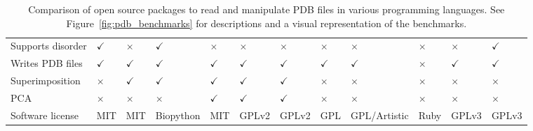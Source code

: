 \begin{table}
\begin{footnotesize}
\begin{tabular}{ l p{1.2cm} p{1.2cm} p{1.5cm} p{1.2cm} p{1.7cm} p{1.2cm} p{1.2cm} p{1.2cm} p{1.2cm} p{1.2cm} p{1.2cm} }
Supports disorder     & $\checkmark$ & $\times$     & $\checkmark$ & $\times$     & $\times$     & $\times$     & $\times$     & $\times$              & $\times$     & $\times$      & $\checkmark$ \\
Writes PDB files      & $\checkmark$ & $\checkmark$ & $\checkmark$ & $\checkmark$ & $\checkmark$ & $\checkmark$ & $\checkmark$ & $\checkmark$          & $\times$     & $\checkmark$  & $\checkmark$ \\
Superimposition       & $\times$     & $\checkmark$ & $\checkmark$ & $\checkmark$ & $\checkmark$ & $\checkmark$ & $\times$     & $\times$              & $\times$     & $\times$      & $\times$     \\
PCA                   & $\times$     & $\times$     & $\times$     & $\checkmark$ & $\checkmark$ & $\checkmark$ & $\times$     & $\times$              & $\times$     & $\times$      & $\times$     \\
Software license      & MIT          & MIT          & Biopython    & MIT          & GPLv2        & GPLv2        & GPL          & GPL/\newline Artistic & Ruby         & GPLv3         & GPLv3        \\
\hline
\end{tabular}
\end{footnotesize}

\caption[Comparison of open source packages to read and manipulate PDB files in various programming languages]
{Comparison of open source packages to read and manipulate PDB files in various programming languages.
See Figure~\ref{fig:pdb_benchmarks} for descriptions and a visual representation of the benchmarks.}

\label{tab:package_comparison}
\end{table}


